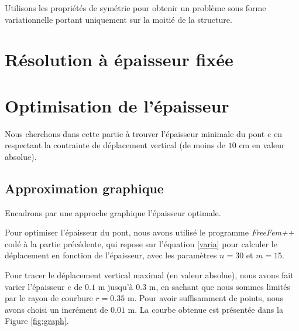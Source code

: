 \documentclass{article}
\begin{document}
    
    

    \begin{problem}{2}
    Utilisons les propriétés de symétrie pour obtenir un problème sous forme variationnelle portant uniquement sur la moitié de la structure.
    \end{problem}
    
    

    \section{Résolution à épaisseur fixée}
        

    \section{Optimisation de l'épaisseur}
    Nous cherchons dans cette partie à trouver l'épaisseur minimale du pont $e$ en respectant la contrainte de déplacement vertical (de moins de $10$ cm en valeur absolue).

    \subsection{Approximation graphique}
    \begin{problem}{5}
        Encadrons par une approche graphique l'épaisseur optimale.
    \end{problem}
    Pour optimiser l'épaisseur du pont,
     nous avons utilisé le programme \emph{FreeFem++} codé à la partie précédente,
     qui repose sur l'équation \ref{varia} pour calculer le déplacement en fonction de l'épaisseur, avec les paramètres $n=30$ et $m=15$.

    Pour tracer le déplacement vertical maximal (en valeur absolue),
    nous avons fait varier l'épaisseur $e$
    de $0.1$ m jusqu'à $0.3$ m, en sachant que nous sommes limités par le rayon de courbure $r = 0.35$ m.
    Pour avoir suffisamment de points, nous avons choisi un incrément de $0.01$ m.
    La courbe obtenue est présentée dans la Figure \ref{fig:graph}.
\end{document}
